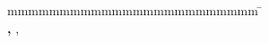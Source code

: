 \begin{titlepage}
	\vfill

	\raggedleft
	\begin{spacing}{1.2}
		\begin{tabbing}
			mmmmmmmmmmmmmmmmmmmmmmmm              \= \kill
			\textbf{\langcstimeofproject} \> \timeperiod\\
			\textbf{\langcsstudentid, \langcscourse} \> \studentid, \course\\
			\textbf{\langcscompany} \> \company\\
			\> \companylocation\\
			\textbf{\langcssupervisor} \> \supervisor\\
		\end{tabbing}
	\end{spacing}
	\vspace{1cm}

	\vspace{1cm}
	\restoregeometry
\end{titlepage}
